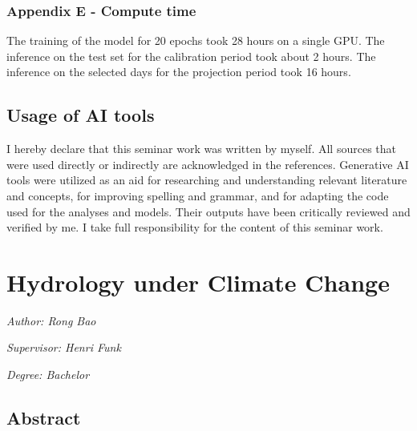 \documentclass[
]{krantz}
\begin{document}
\subsection{Appendix E - Compute time}\label{ddm-appendix-e}

The training of the model for 20 epochs took 28 hours on a single GPU.
The inference on the test set for the calibration period took about 2 hours.
The inference on the selected days for the projection period took 16 hours.

\section{Usage of AI tools}\label{usage-of-ai-tools}

I hereby declare that this seminar work was written by myself. All sources that were used directly or indirectly are acknowledged in the references.
Generative AI tools were utilized as an aid for researching and understanding relevant literature and concepts, for improving spelling and grammar, and for adapting the code used for the analyses and models.
Their outputs have been critically reviewed and verified by me. I take full responsibility for the content of this seminar work.

\chapter{Hydrology under Climate Change}\label{hyd}

\emph{Author: Rong Bao}

\emph{Supervisor: Henri Funk}

\emph{Degree: Bachelor}

\section{Abstract}\label{abstract}
\end{document}
